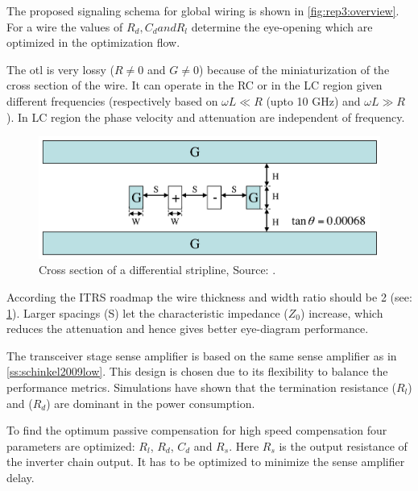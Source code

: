 \summary
The proposed signaling schema for global wiring is shown in \cref{fig:rep3:overview}.
For a wire the values of $R_{d}, C_{d} and R_{l}$ determine the eye-opening which are optimized in the optimization flow.

The \ac{otl} is very lossy ($R \neq 0$ and $G \neq 0$) because of the miniaturization of the cross section of the wire.
It can operate in the RC or in the LC region given different frequencies (respectively based on $\omega L \ll R$ (upto 10 GHz) and $\omega L \gg R$).
In LC region the phase velocity and attenuation are independent of frequency.

\begin{figure}	\centering
	
	\includegraphics[width=0.95\linewidth]{Figures/Rep3TransmissionLine.png}
	\caption{Cross section of a differential stripline, Source: \cite{zhang2009high}.} 
    \label{fig:rep3:crosssection}
\end{figure}
According the ITRS roadmap the wire thickness and width ratio should be 2 (see: \cref{fig:rep3:crosssection}).
Larger spacings (S) let the characteristic impedance ($Z_{0}$) increase, which reduces the attenuation and hence gives better eye-diagram performance. %

The transceiver stage sense amplifier is based on the same sense amplifier as in \cref{ss:schinkel2009low}.
This design is chosen due to its flexibility to balance the performance metrics.
Simulations have shown that the termination resistance ($R_{l}$) and ($R_{d}$) are dominant in the power consumption.

To find the optimum passive compensation for high speed compensation four parameters are optimized: $R_{l}$, $R_{d}$, $C_{d}$ and $R_{s}$.
Here $R_{s}$ is the output resistance of the inverter chain output.
It has to be optimized to minimize the sense amplifier delay.


